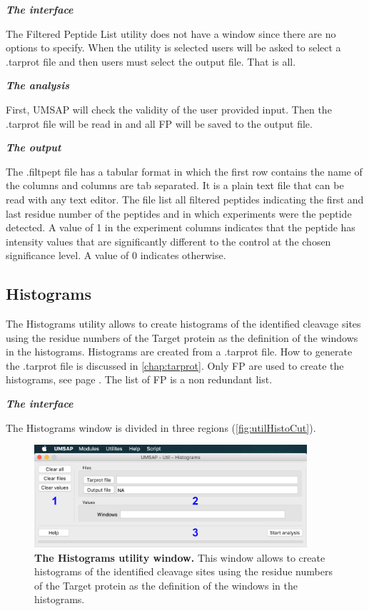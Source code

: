 \textit{\textbf{The interface}}

The Filtered Peptide List utility does not have a window since there are no options to specify. When the utility is selected users will be asked to select a .tarprot file and then users must select the output file. That is all.

\textit{\textbf{The analysis}}

First, UMSAP will check the validity of the user provided input. Then the .tarprot file will be read in and all FP will be saved to the output file.

\textit{\textbf{The output}}

The .filtpept file has a tabular format in which the first row contains the name of the columns and columns are tab separated. It is a plain text file that can be read with any text editor. The file list all filtered peptides indicating the first and last residue number of the peptides and in which experiments were the peptide detected. A value of 1 in the experiment columns indicates that the peptide has intensity values that are significantly different to the control at the chosen significance level. A value of 0 indicates otherwise.

\subsection{Histograms}
\label{subsec:utilHistoCut}
The Histograms utility allows to create histograms of the identified cleavage sites using the residue numbers of the Target protein as the definition of the windows in the histograms. Histograms are created from a .tarprot file. How to generate the .tarprot file is discussed in \autoref{chap:tarprot}. Only FP are used to create the histograms, see page \pageref{par:tarprotPIP}. The list of FP is a non redundant list. 

\textit{\textbf{The interface}}

The Histograms window is divided in three regions (\autoref{fig:utilHistoCut}).

\begin{figure}[h]
	\centering
	\includegraphics[width=0.9\textwidth]{./IMAGES/UTIL-HIST-WINDOW/util-histo.jpg}	    
	\caption[The Histograms utility window]{\textbf{The Histograms utility window.} This window allows to create histograms of the identified cleavage sites using the residue numbers of the Target protein as the definition of the windows in the histograms.} 
	\label{fig:utilHistoCut}
	\vspace{-5pt} 	
\end{figure}


